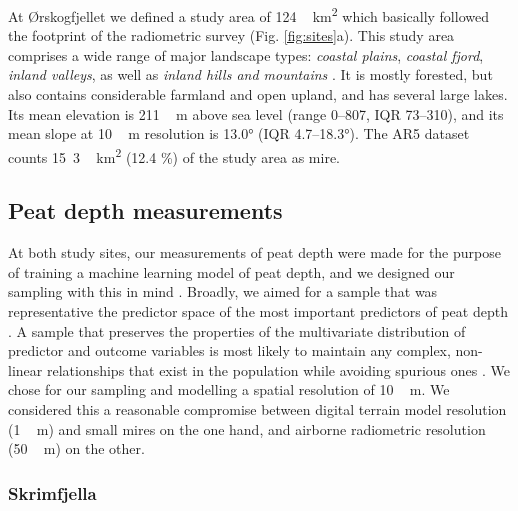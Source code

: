 \documentclass[soil, manuscript]{copernicus}
\begin{document}
At Ørskogfjellet we defined a study area of \unit{124\,km^{2}} which basically followed the footprint of the radiometric survey (Fig. \ref{fig:sites}a).
This study area comprises a wide range of major landscape types: \emph{coastal plains}, \emph{coastal fjord}, \emph{inland valleys}, as well as \emph{inland hills and mountains} \citep{simensenDiversityDistributionLandscape2021}.
It is mostly forested, but also contains considerable farmland and open upland, and has several large lakes.
Its mean elevation is \unit{211\,m} above sea level (range 0--807, IQR 73--310), and its mean slope at \unit{10\,m} resolution is 13.0° (IQR 4.7--18.3°).
The AR5 dataset counts \unit{15.3\,km^{2}} (12.4 \%) of the study area as mire.

\subsection{Peat depth measurements}

At both study sites, our measurements of peat depth were made for the purpose of training a machine learning model of peat depth, and we designed our sampling with this in mind \citep{brusSamplingDigitalSoil2019}.
Broadly, we aimed for a sample that was representative the predictor space of the most important predictors of peat depth \citep{wadouxSamplingDesignOptimization2019, maComparisonConditionedLatin2020}.
A sample that preserves the properties of the multivariate distribution of predictor and outcome variables is most likely to maintain any complex, non-linear relationships that exist in the population while avoiding spurious ones \citep{brusSamplingDigitalSoil2019}.
We chose for our sampling and modelling a spatial resolution of \unit{10\,m}.
We considered this a reasonable compromise between digital terrain model resolution (\unit{1\,m}) and small mires on the one hand, and airborne radiometric resolution (\unit{50\,m}) on the other.

\subsubsection{Skrimfjella}
\end{document}
